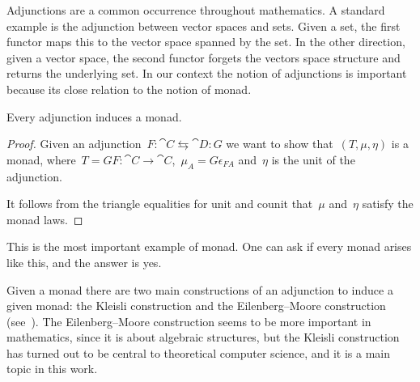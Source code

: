 \documentclass[../TFG.tex]{subfiles}
\begin{document}
Adjunctions are a common occurrence throughout mathematics. A standard example
is the adjunction between vector spaces and sets. Given a set, the first functor
maps this to the vector space spanned by the set. In the other direction, given
a vector space, the second functor forgets the vectors space structure and
returns the underlying set. In our context the notion of adjunctions is
important because its close relation to the notion of monad.

\begin{proposition}
    \label{prop:adjunction-induces-monad}
    Every adjunction induces a monad.
\end{proposition}
\begin{proof}
    Given an adjunction~\(F:\cat{C}\leftrightarrows\cat{D}:G\) we want to show
    that~\((T,\mu,\eta)\) is a monad,
    where~\(T=GF:\cat{C}\longrightarrow\cat{C}\),~\(\mu_{A}=G\epsilon_{FA}\)
    and~\(\eta\) is the unit of the adjunction.

    It follows from the triangle equalities for unit and counit that~\(\mu\)
    and~\(\eta\) satisfy the monad laws.
\end{proof}
This is the most important example of monad. One can ask if every monad arises
like this, and the answer is yes.

Given a monad there are two main constructions of an adjunction to induce a
given monad: the Kleisli construction and the Eilenberg--Moore construction
(see~\cite{maclane}). The Eilenberg--Moore construction seems to be more
important in mathematics, since it is about algebraic structures, but the
Kleisli construction has turned out to be central to theoretical computer
science, and it is a main topic in this work.
\end{document}
